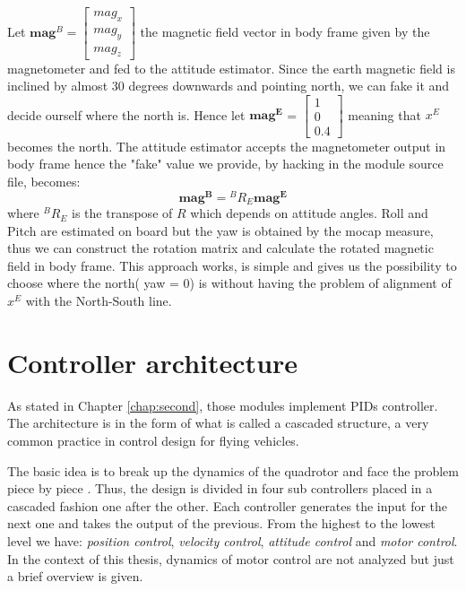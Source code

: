 \noindent
Let $\boldsymbol{mag}^B = \begin{bmatrix}mag_x\\mag_y\\mag_z\end{bmatrix}$ the magnetic field vector in body frame given by the magnetometer and fed to the attitude estimator. Since the earth magnetic field is inclined by almost 30 degrees downwards and pointing north, we can fake it and decide ourself where the north is. Hence let $\boldsymbol{mag^E}$ = $\begin{bmatrix}1\\0\\0.4\end{bmatrix}$ meaning that $x^E$ becomes the north. The attitude estimator accepts the magnetometer output in body frame hence the "fake" value we provide, by hacking in the module source file, becomes:
\begin{equation}
	 \boldsymbol{mag^B} = {}^BR_E \boldsymbol{mag^E}
\end{equation}
where  ${}^BR_E$ is the transpose of $R$ which depends on attitude angles. Roll and Pitch are estimated on board but the yaw is obtained by the mocap measure, thus we can construct the rotation matrix and calculate the rotated magnetic field in body frame. This approach works, is simple and gives us the possibility to choose where the north( yaw = 0) is without having the problem of alignment of $x^E$ with the North-South line.

\section{Controller architecture}

As stated in Chapter \ref{chap:second}, those modules implement PIDs controller. The architecture is in the form of what is called a cascaded structure, a very common practice in control design for flying vehicles. 

The basic idea is to break up the dynamics of the quadrotor and face the problem piece by piece \cite{Mellinger2012}. Thus, the design is divided in four sub controllers placed in a cascaded fashion one after the other. Each controller generates the input for the next one and takes the output of the previous. From the highest to the lowest level we have:\textit{ position control}, \textit{velocity control}, \textit{attitude control} and\textit{ motor control}. In the context of this thesis, dynamics of motor control are not analyzed but just a brief overview is given. 

